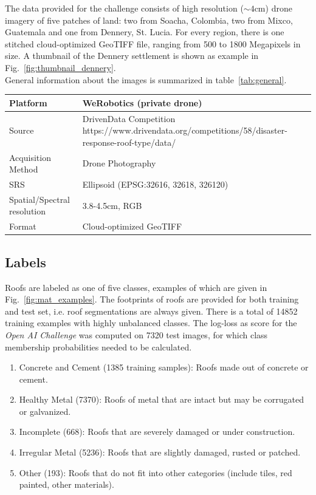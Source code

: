 \documentclass[11pt]{article}
\begin{document}
	The data provided for the challenge consists of high resolution ($\sim4$cm) drone imagery of five patches of land: two from Soacha, Colombia, two from Mixco, Guatemala and one from Dennery, St. Lucia.
	For every region, there is one stitched cloud-optimized GeoTIFF file, ranging from 500 to 1800 Megapixels in size. A thumbnail of the Dennery settlement is shown as example in Fig.~\ref{fig:thumbnail_dennery}.\\
	General information about the images is summarized in table~\ref{tab:general}.

	\begin{center}
		\bgroup
		\def\arraystretch{1.1}
		\begin{tabular}{ | m{5cm} | m{10cm}|} 
			\hline
			Platform & WeRobotics (private drone)  \\ 
			\hline
			Source & DrivenData Competition \newline https://www.drivendata.org/competitions/58/disaster-response-roof-type/data/ \\ 
			\hline
			Acquisition Method & Drone Photography  \\ 
			\hline
			SRS  & Ellipsoid (EPSG:32616, 32618, 326120)  \\ 
			\hline
			Spatial/Spectral resolution & 3.8-4.5cm, RGB  \\ 
			\hline
			Format & Cloud-optimized GeoTIFF \\ 
			\hline
		\end{tabular}
		\egroup		
		\label{tab:general}
	\end{center}
	
	\subsection{Labels}
	Roofs are labeled as one of five classes, examples of which are given in Fig.~\ref{fig:mat_examples}. The footprints of roofs are provided for both training and test set, i.e. roof segmentations are always given. There is a total of 14852 training examples with highly unbalanced classes.
	The log-loss as score for the \textit{Open AI Challenge} was computed on 7320 test images, for which class membership probabilities needed to be calculated.
	
	\begin{enumerate}
		\itemsep0em
		\item Concrete and Cement (1385 training samples): Roofs made out of concrete or cement.
		\item Healthy Metal (7370): Roofs of metal that are intact but may be corrugated or galvanized.
		\item Incomplete (668): Roofs that are severely damaged or under construction.
		\item Irregular Metal (5236): Roofs that are slightly damaged, rusted or patched.
		\item Other (193): Roofs that do not fit into other categories (include tiles, red painted, other materials).
	\end{enumerate}
\end{document}
